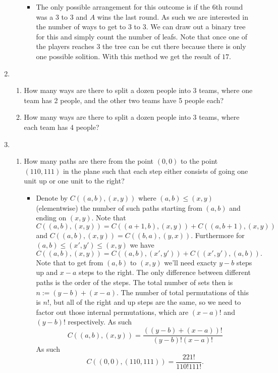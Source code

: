 \documentclass{article}
\begin{document}
\begin{enumerate}
\begin{enumerate}
				\begin{itemize}
					\item The only possible arrangement for this outcome is if the $6$th round was a $3$ to $3$ and $A$ wins the last round. As such we are interested in the number of ways to get to $3$ to $3$. We can draw out a binary tree for this and simply count the number of leafs. Note that once one of the players reaches $3$ the tree can be cut there because there is only one possible solition. With this method we get the result of $17$.
				\end{itemize}
		\end{enumerate}
	\item
		\begin{enumerate}
			\item How many ways are there to split a dozen people into 3 teams, where one team has 2 people, and the other two teams have 5 people each?
			\item How many ways are there to split a dozen people into 3 teams, where each team has 4 people?
		\end{enumerate}
	\item
		\begin{enumerate}
			\item How many paths are there from the point $(0, 0)$ to the point $(110, 111)$ in the plane such that each step either consists of going one unit up or one unit to the right?
				\begin{itemize}
					\item Denote by $C((a, b), (x, y))$ where $(a, b) \leq (x, y)$ (elementwise) the number of such paths starting from $(a, b)$ and ending on $(x, y)$. Note that $C((a, b), (x, y)) = C((a + 1, b), (x, y)) + C((a, b + 1), (x, y))$ and $C((a, b), (x, y)) = C((b, a), (y, x))$. Furthermore for $(a, b) \leq (x', y') \leq (x, y)$ we have
					$$
					C((a, b), (x, y)) = C((a, b), (x', y')) + C((x', y'), (a, b)).
					$$
					Note that to get from $(a, b)$ to $(x, y)$ we'll need exacty $y - b$ steps up and $x - a$ steps to the right. The only difference between different paths is the order of the steps. The total number of sets then is $n := (y - b) + (x - a)$. The number of total permutations of this is $n!$, but all of the right and up steps are the same, so we need to factor out those internal permutations, which are $(x - a)!$ and $(y - b)!$ respectively. As such
					$$
					C((a, b), (x, y)) = \frac{((y - b) + (x - a))!}{(y - b)!(x - a)!}
					$$
					As such
					$$
					C((0, 0), (110, 111)) = \frac{221!}{110!111!}.
$$
\end{itemize}
\end{enumerate}
\end{enumerate}
\end{document}
